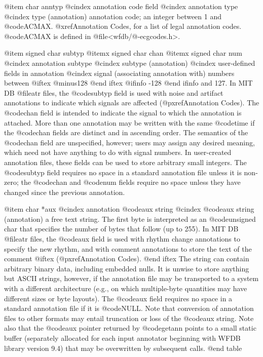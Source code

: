 {{{{{{{{{{@item char anntyp
@cindex annotation code field
@cindex annotation type
@cindex type (annotation)
annotation code; an integer between 1 and @code{ACMAX}.
@xref{Annotation Codes}, for a list of legal annotation codes.
@code{ACMAX} is defined in @file{<wfdb/@-ecgcodes.h>}.

@item signed char subtyp
@itemx signed char chan
@itemx signed char num
@cindex annotation subtype
@cindex subtype (annotation)
@cindex user-defined fields in annotation
@cindex signal (associating annotation with)
numbers between
@iftex
@minus{}128
@end iftex
@ifinfo
-128
@end ifinfo
and 127.  In MIT DB @file{atr} files, the
@code{subtyp} field is used with noise and artifact annotations to
indicate which signals are affected (@pxref{Annotation Codes}).
The @code{chan} field is intended to indicate the signal to which the
annotation is attached.  More than one annotation may be written with
the same @code{time} if the @code{chan} fields are distinct and in
ascending order.  The semantics of the @code{chan} field are
unspecified, however; users may assign any desired meaning, which need
not have anything to do with signal numbers.  In user-created annotation
files, these fields can be used to store arbitrary small integers.  The
@code{subtyp} field requires no space in a standard annotation file
unless it is non-zero; the @code{chan} and @code{num} fields require no
space unless they have changed since the previous annotation.

@item char *aux
@cindex annotation @code{aux} string
@cindex @code{aux} string (annotation)
a free text string.  The first byte is interpreted as an @code{unsigned
char} that specifies the number of bytes that follow (up to 255).  In
MIT DB @file{atr} files, the @code{aux} field is used with rhythm
change annotations to specify the new rhythm, and with comment
annotations to store the text of the comment
@iftex
(@pxref{Annotation Codes}).
@end iftex
The string can contain arbitrary binary
data, including embedded nulls.  It is unwise to store anything but ASCII
strings, however, if the annotation file may be transported to a system with
a different architecture (e.g., on which multiple-byte quantities may have
different sizes or byte layouts).  The @code{aux} field requires no
space in a standard annotation file if it is @code{NULL}.  Note that
conversion of annotation files to other formats may entail truncation or
loss of the @code{aux} string.  Note also that the @code{aux} pointer
returned by @code{getann} points to a small static buffer (separately
allocated for each input annotator beginning with WFDB library version
9.4) that may be overwritten by subsequent calls.
@end table

}}}}}}}}}}
